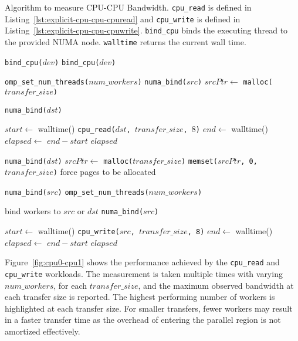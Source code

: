 \begin{algorithm}
	\caption[test]{
		Algorithm to measure CPU-CPU Bandwidth.
		\texttt{cpu\_read} is defined in Listing~\ref{lst:explicit-cpu-cpu-cpuread} and \texttt{cpu\_write} is defined in Listing~\ref{lst:explicit-cpu-cpu-cpuwrite}.
		\texttt{bind\_cpu} binds the executing thread to the provided NUMA node.
		\texttt{walltime} returns the current wall time.
	}
	\label{alg:explicit-cpu-cpu}
	\begin{algorithmic}[1]
		\Statex
        
        \State \texttt{bind\_cpu($dev$)}
        \State \texttt{bind\_cpu($dev$)}
        \EndFor
        \EndFunction

		\State \texttt{omp\_set\_num\_threads($num\_workers$)}
		\State \texttt{numa\_bind($src$)}
		\State $srcPtr \gets$ \texttt{malloc($transfer\_size$)}
		
		\State \texttt{numa\_bind($dst$)}
		\Statex

		\State $start \gets$ walltime()
		\State \texttt{cpu\_read($dst$, $transfer\_size$, $8$)}
		\State $end \gets$ walltime()
        \State $elapsed \gets$ $end-start$
		\State \Return $elapsed$
		\EndFunction
		
		\State \texttt{numa\_bind($dst$)}
		\State $srcPtr \gets$ \texttt{malloc($transfer\_size$)}
		\State \texttt{memset($srcPtr$, 0, $transfer\_size$)} \Comment force pages to be allocated
		
		\State \texttt{numa\_bind($src$)}
		\State \texttt{omp\_set\_num\_threads($num\_workers$)}
		\Statex
		        
		 \Comment bind workers to $src$ or $dst$
		\State \texttt{numa\_bind($src$)}
		\EndFor
		
		\State $start \gets$ walltime()
		\State \texttt{cpu\_write($src$, $transfer\_size$, 8)}
		\State $end \gets$ walltime()
        \State $elapsed \gets$ $end-start$
		\State \Return $elapsed$
		\EndFunction
		
	\end{algorithmic}
\end{algorithm}


Figure~\ref{fig:cpu0-cpu1} shows the performance achieved by the \texttt{cpu\_read} and \texttt{cpu\_write} workloads.
The measurement is taken multiple times with varying $num\_workers$, for each $transfer\_size$, and the maximum observed bandwidth
at each transfer size is reported.
The highest performing number of workers is highlighted at each transfer size.
For smaller transfers, fewer workers may result in a faster transfer time as the overhead of entering the parallel region is not amortized effectively.

